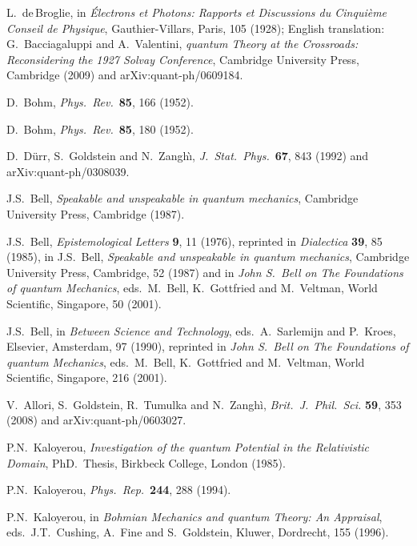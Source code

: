 \documentclass[12pt]{article}
\begin{document}
\begin{thebibliography}{100}

{L.\ de$\,$Broglie, in {\em \'Electrons et Photons: Rapports et Discussions du
  Cinqui\`eme Conseil de Physique}, Gauthier-Villars, Paris, 105 (1928);
  English translation: G.\ Bacciagaluppi and A.\ Valentini, {\em quantum Theory
  at the Crossroads: Reconsidering the 1927 Solvay Conference}, Cambridge
  University Press, Cambridge (2009) and arXiv:quant-ph/0609184.}

{D.\ Bohm, {\em Phys.\ Rev.}\ {\bf 85}, 166 (1952).}

{D.\ Bohm, {\em Phys.\ Rev.}\ {\bf 85}, 180 (1952).}

{D.\ D\"urr, S.\ Goldstein and N.\ Zangh\`\i, {\em J.\ Stat.\ Phys.}\ {\bf 67},
  843 (1992) and arXiv:quant-ph/0308039.}

{J.S.\ Bell, {\em Speakable and unspeakable in quantum mechanics}, Cambridge
  University Press, Cambridge (1987).}

{J.S.\ Bell, {\em Epistemological Letters} {\bf 9}, 11 (1976), reprinted in
  {\em Dialectica} {\bf 39}, 85 (1985), in J.S.\ Bell, {\em Speakable and
  unspeakable in quantum mechanics}, Cambridge University Press, Cambridge, 52
  (1987) and in {\em John S.\ Bell on The Foundations of quantum Mechanics},
  eds.\ M.\ Bell, K.\ Gottfried and M.\ Veltman, World Scientific, Singapore,
  50 (2001).}

{J.S.\ Bell, in {\em Between Science and Technology}, eds.\ A.\ Sarlemijn and
  P.\ Kroes, Elsevier, Amsterdam, 97 (1990), reprinted in {\em John S.\ Bell on
  The Foundations of quantum Mechanics}, eds.\ M.\ Bell, K.\ Gottfried and M.\
  Veltman, World Scientific, Singapore, 216 (2001).}

{V.\ Allori, S.\ Goldstein, R.\ Tumulka and N.\ Zangh\`i, {\em Brit.\ J.\
  Phil.\ Sci.} {\bf 59}, 353 (2008) and arXiv:quant-ph/0603027.}

\bibitem{kaloyerou85}
{P.N.\ Kaloyerou, {\em Investigation of the quantum Potential in the
  Relativistic Domain}, PhD.\ Thesis, Birkbeck College, London (1985).}

\bibitem{kaloyerou94}
{P.N.\ Kaloyerou, {\em Phys.\ Rep.}\ {\bf 244}, 288 (1994).}

{P.N.\ Kaloyerou, in {\em Bohmian Mechanics and quantum Theory: An Appraisal},
  eds.\ J.T.\ Cushing, A.\ Fine and S.\ Goldstein, Kluwer, Dordrecht, 155
  (1996).}


\end{thebibliography}
\end{document}

